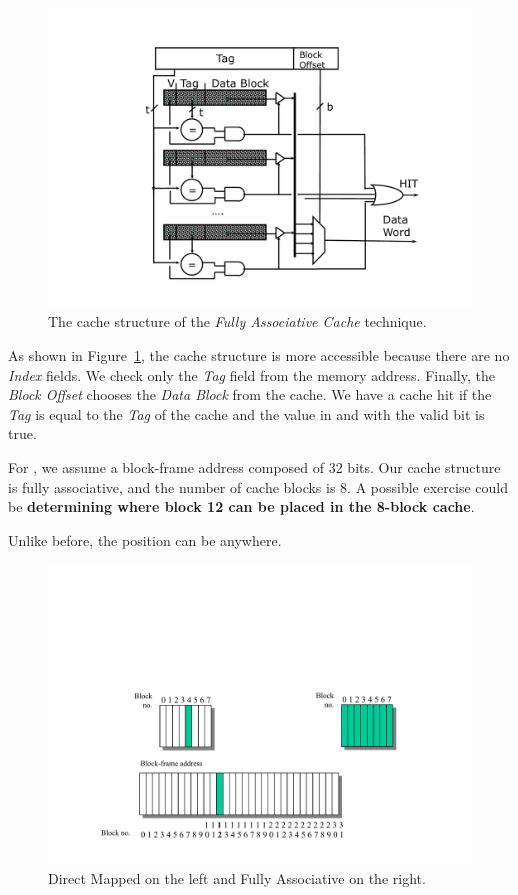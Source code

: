 \begin{figure}[!htp]
    \centering
    \includegraphics[width=.7\textwidth]{img/fully-associative-cache-2.pdf}
    \caption{The cache structure of the \emph{Fully Associative Cache} technique.}
    \label{fig: cache structure of the Fully Associative Cache}
\end{figure}

\noindent
As shown in Figure~\ref{fig: cache structure of the Fully Associative Cache}, the cache structure is more accessible because there are no \emph{Index} fields. We check only the \emph{Tag} field from the memory address. Finally, the \emph{Block Offset} chooses the \emph{Data Block} from the cache. We have a cache hit if the \emph{Tag} is equal to the \emph{Tag} of the cache and the value in and with the valid bit is true.

\newpage

\noindent
For , we assume a block-frame address composed of 32 bits. Our cache structure is fully associative, and the number of cache blocks is 8. A possible exercise could be \textbf{determining where block 12 can be placed in the 8-block cache}.

\highspace
Unlike before, the position can be anywhere.

\begin{figure}[!htp]
    \centering
    \includegraphics[width=.8\textwidth]{img/fully-associative-cache-3.pdf}
    \caption*{Direct Mapped on the left and Fully Associative on the right.}
\end{figure}

